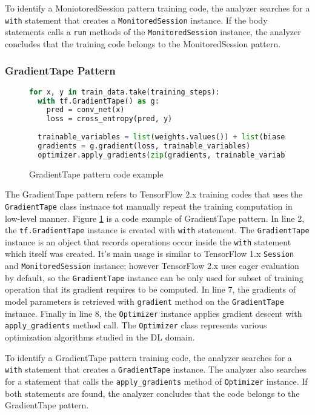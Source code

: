 To identify a MoniotoredSession pattern training code,
the analyzer searches for a {\tt with} statement that creates a
{\tt MonitoredSession} instance.
If the body statements calls a {\tt run} methods of the {\tt MonitoredSession}
instance, the analyzer concludes that the training code belongs to the
MonitoredSession pattern.


\subsubsection{GradientTape Pattern}

\begin{figure}[!ht]
  \begin{lstlisting}[language=Python]
for x, y in train_data.take(training_steps):
  with tf.GradientTape() as g:
    pred = conv_net(x)
    loss = cross_entropy(pred, y)
    
  trainable_variables = list(weights.values()) + list(biases.values())
  gradients = g.gradient(loss, trainable_variables)
  optimizer.apply_gradients(zip(gradients, trainable_variables))
  \end{lstlisting}
  \caption{GradientTape pattern code example}
  \label{fig:tapepattern}
\end{figure}



The GradientTape pattern refers to TensorFlow 2.x training codes that
uses the {\tt GradientTape} class instnace tot manually repeat the 
training computation in low-level manner.
Figure \ref{fig:tapepattern} is a code example of GradientTape pattern.
In line 2, the {\tt tf.GradientTape} instance is created with
{\tt with} statement.
The {\tt GradientTape} instance is an object that records operations
occur inside the {\tt with} statement which itself was created. 
It's main usage is similar to TensorFlow 1.x {\tt Session} and
{\tt MonitoredSession} instance; however TensorFlow 2.x uses eager evaluation
by default, so the {\tt GradientTape} instance can be only used for
subset of training operation that its gradient requires to be computed.
In line 7, the gradients of model parameters is retrieved with
{\tt gradient} method on the {\tt GradientTape} instance.
Finally in line 8, the {\tt Optimizer} instance applies gradient descent with
{\tt apply\_gradients} method call.
The {\tt Optimizer} class represents various optimization algorithms studied in 
the DL domain.

To identify a GradientTape pattern training code,
the analyzer searches for a {\tt with} statement that creates a
{\tt GradientTape} instance.
The analyzer also searches for a statement that calls the {\tt apply\_gradients}
method of {\tt Optimizer} instance.
If both statements are found, the analyzer concludes that the code
belongs to the GradientTape pattern.

